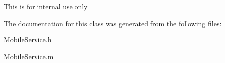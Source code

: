 \label{interface_mobile_service_a52f0671f42c9430cfffbf644fee32858}
\-This is for internal use only 

\-The documentation for this class was generated from the following files\-:\begin{DoxyCompactItemize}
\item 
\-Mobile\-Service.\-h\item 
\-Mobile\-Service.\-m\end{DoxyCompactItemize}
